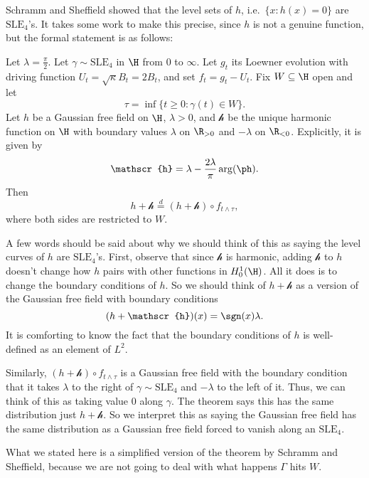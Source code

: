 \documentclass[a4paper]{article}
\newcommand\SLE{\mathrm{SLE}}
\begin{document}
Schramm and Sheffield showed that the level sets of $h$, i.e.\ $\{x : h(x) = 0\}$ are $\SLE_4$'s. It takes some work to make this precise, since $h$ is not a genuine function, but the formal statement is as follows:
\begin{thm}
  Let $\lambda = \frac{\pi}{2}$. Let $\gamma \sim \SLE_4$ in $\H$ from $0$ to $\infty$. Let $g_t$ its Loewner evolution with driving function $U_t = \sqrt{\kappa} B_t = 2 B_t$, and set $f_t = g_t - U_t$. Fix $W \subseteq \H$ open and let
  \[
    \tau = \inf \{t \geq 0: \gamma(t) \in W\}.
  \]
  Let $h$ be a Gaussian free field on $\H$, $\lambda > 0$, and $\mathscr{h}$ be the unique harmonic function on $\H$ with boundary values $\lambda$ on $\R_{>0}$ and $-\lambda$ on $\R_{<0}$. Explicitly, it is given by
  \[
    \mathscr{h} = \lambda - \frac{2\lambda}{\pi} \arg(\ph).
  \]
  Then
  \[
    h + \mathscr{h} \overset{d}{=} (h + \mathscr{h}) \circ f_{t \wedge \tau},
  \]
  where both sides are restricted to $W$.
\end{thm}
A few words should be said about why we should think of this as saying the level curves of $h$ are $\SLE_4$'s. First, observe that since $\mathscr{h}$ is harmonic, adding $\mathscr{h}$ to $h$ doesn't change how $h$ pairs with other functions in $H_0^1(\H)$. All it does is to change the boundary conditions of $h$. So we should think of $h + \mathscr{h}$ as a version of the Gaussian free field with boundary conditions
\[
  (h + \mathscr{h})(x) = \sgn(x) \lambda.
\]
It is comforting to know the fact that the boundary conditions of $h$ is well-defined as an element of $L^2$.

Similarly, $(h + \mathscr{h}) \circ f_{t \wedge \tau}$ is a Gaussian free field with the boundary condition that it takes $\lambda$ to the right of $\gamma \sim \SLE_4$ and $-\lambda$ to the left of it. Thus, we can think of this as taking value $0$ along $\gamma$. The theorem says this has the same distribution just $h + \mathscr{h}$. So we interpret this as saying the Gaussian free field has the same distribution as a Gaussian free field forced to vanish along an $\SLE_4$.

What we stated here is a simplified version of the theorem by Schramm and Sheffield, because we are not going to deal with what happens $\Gamma$ hits $W$.
\end{document}
